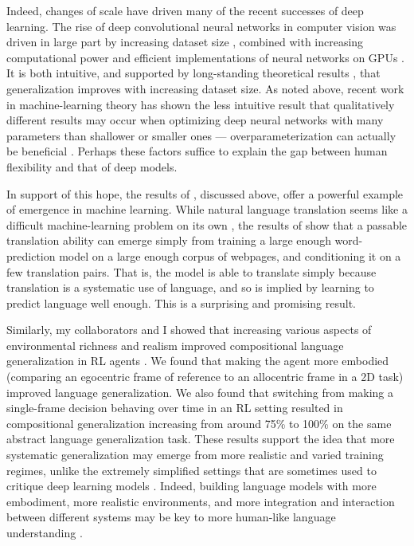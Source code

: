 Indeed, changes of scale have driven many of the recent successes of deep learning. The rise of deep convolutional neural networks in computer vision was driven in large part by increasing dataset size \citep{Deng2009}, combined with increasing computational power and efficient implementations of neural networks on GPUs \citep{Krizhevsky2012}. It is both intuitive, and supported by long-standing theoretical results \citep{Bartlett2002}, that generalization improves with increasing dataset size. As noted above, recent work in machine-learning theory has shown the less intuitive result that qualitatively different results may occur when optimizing deep neural networks with many parameters than shallower or smaller ones --- overparameterization can actually be beneficial \citep{Dauphin2014, Arora2018a}. Perhaps these factors suffice to explain the gap between human flexibility and that of deep models.\par 
In support of this hope, the results of \citet{Radford2019}, discussed above, offer a powerful example of emergence in machine learning. While natural language translation seems like a difficult machine-learning problem on its own \citep{Wu2016}, the results of \citet{Radford2019} show that a passable translation ability can emerge simply from training a large enough word-prediction model on a large enough corpus of webpages, and conditioning it on a few translation pairs. That is, the model is able to translate simply because translation is a systematic use of language, and so is implied by learning to predict language well enough. This is a surprising and promising result. \par 
Similarly, my collaborators and I showed that increasing various aspects of environmental richness and realism improved compositional language generalization in RL agents \citep{Hill2019a}. We found that making the agent more embodied (comparing an egocentric frame of reference to an allocentric frame in a 2D task) improved language generalization. We also found that switching from making a single-frame decision behaving over time in an RL setting resulted in compositional generalization increasing from around 75\% to 100\% on the same abstract language generalization task. These results support the idea that more systematic generalization may emerge from more realistic and varied training regimes, unlike the extremely simplified settings that are sometimes used to critique deep learning models \citep[see e.g.][]{Lake2017}. Indeed, building language models with more embodiment, more realistic environments, and more integration and interaction between different systems may be key to more human-like language understanding \citep{McClelland2019}.\par
